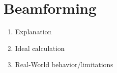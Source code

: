 \section{Beamforming}

\begin{enumerate}
  \item Explanation
  \item Ideal calculation
  \item Real-World behavior/limitations
\end{enumerate}